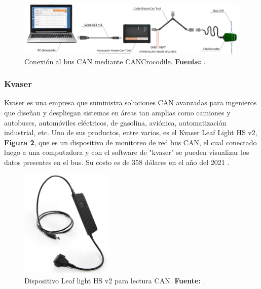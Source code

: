 \begin{figure}[H]
	\centering
	\includegraphics[width=1.0\textwidth]{./Cap3imagen/esquemaMasterCAN.png}
	\caption[ Conexión al bus CAN mediante CANCrocodile.]{ Conexión al bus CAN mediante CANCrocodile.\textbf{ Fuente:} \cite{cite_mastertool_c3}.}
	\label{fig_sistemacocodrile_c3} %
\end{figure}

\subsubsection{Kvaser}
Kvaser es una empresa que suministra soluciones CAN avanzadas para ingenieros que diseñan y despliegan sistemas en áreas tan amplias como camiones y autobuses, automóviles eléctricos, de gasolina, aviónica,  automatización industrial, etc. Uno de sus productos, entre varios, es el  Kvaser Leaf Light HS v2, \textbf{Figura \ref{fig_kvaserLeafLight_c3}},  que es un dispositivo de monitoreo de red bus CAN, el cual conectado luego a una computadora y con el software de "kvaser"  se pueden visualizar los datos presentes en el bus.  Su costo es de 358 dólares en el año del 2021 \cite{cite_kvaserLeaf_c3}.


\begin{figure}[H]
	\centering
	\includegraphics[width=0.4\textwidth]{./Cap3imagen/kvaserLeafLight.jpg}
	\caption[ Dispositivo Leaf light HS v2 para lectura CAN.]{Dispositivo Leaf light HS v2 para lectura CAN.\textbf{ Fuente:} \cite{cite_kvaserLeaf_c3}.}
	\label{fig_kvaserLeafLight_c3} %
\end{figure}

